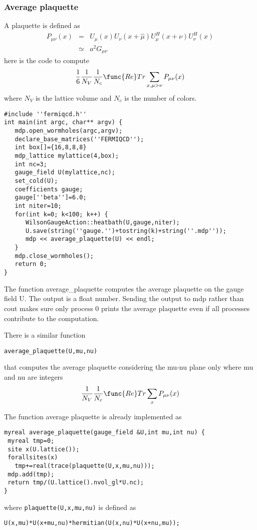 \subsubsection{Average plaquette}

A plaquette is defined as
\begin{eqnarray*}
P_{\mu \nu }(x) &=&U_\mu (x)U_\nu (x+\widehat{\mu })U_\mu ^H(x+\nu )U_\nu
^H(x) \\
&\simeq &a^2G_{\mu \nu }
\end{eqnarray*}
here is the code to compute
\[
\frac 16\frac 1{N_V}\frac 1{N_c}\func{Re}Tr\sum_{x,\mu >\nu }P_{\mu \nu }(x)
\]
where $N_V$ is the lattice volume and $N_c$ is the number of colors.
\begin{verbatim}
#include ''fermiqcd.h''
int main(int argc, char** argv) {
   mdp.open_wormholes(argc,argv);
   declare_base_matrices(''FERMIQCD'');
   int box[]={16,8,8,8}
   mdp_lattice mylattice(4,box);
   int nc=3;
   gauge_field U(mylattice,nc);
   set_cold(U);
   coefficients gauge;
   gauge[''beta'']=6.0;
   int niter=10;
   for(int k=0; k<100; k++) {
      WilsonGaugeAction::heatbath(U,gauge,niter);
      U.save(string(''gauge.'')+tostring(k)+string(''.mdp''));
      mdp << average_plaquette(U) << endl;
   }
   mdp.close_wormholes();
   return 0;
}
\end{verbatim}

The function average\_plaquette computes the average plaquette on the gauge
field U. The output is a float number. Sending the output to mdp rather than
cout makes sure only process 0 prints the average plaquette even if all
processes contribute to the computation.

There is a similar function
\begin{verbatim}
average_plaquette(U,mu,nu)
\end{verbatim}

that computes the average plaquette considering the mu-nu plane only where
mu and nu are integers
\[
\frac 1{N_V}\frac 1{N_c}\func{Re}Tr\sum_xP_{\mu \nu }(x)
\]

The function average plaquette is already implemented as
\begin{verbatim}
myreal average_plaquette(gauge_field &U,int mu,int nu) {
 myreal tmp=0;
 site x(U.lattice());
 forallsites(x)
   tmp+=real(trace(plaquette(U,x,mu,nu)));
 mdp.add(tmp);
 return tmp/(U.lattice().nvol_gl*U.nc);
}
\end{verbatim}

where {\tt plaquette(U,x,mu,nu)} is defined as
\begin{verbatim}
U(x,mu)*U(x+mu,nu)*hermitian(U(x,nu)*U(x+nu,mu)); 
\end{verbatim}

